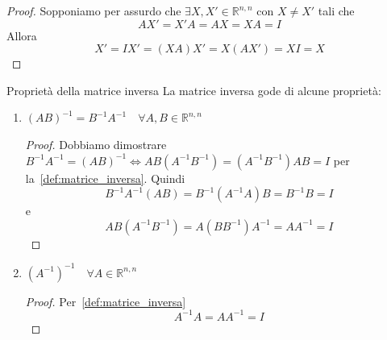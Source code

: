 \begin{proof}
  Sopponiamo per assurdo che $\exists X,X'\in\mathbb{R}^{n,n}$ con $X\neq X'$ tali che
  \begin{equation*}
    AX'=X'A=AX=XA=I
  \end{equation*}
  Allora
  \begin{equation*}
    X'=IX' = (XA)X' = X(AX') = XI = X
  \end{equation*}
\end{proof}

\begin{SubDef}{Proprietà della matrice inversa}
  La matrice inversa gode di alcune proprietà:
  \begin{enumerate}
    \item $(AB)^{-1} = B^{-1}A^{-1}\quad\forall A,B\in\mathbb{R}^{n,n}$
      \begin{proof}
        Dobbiamo dimostrare $B^{-1}A^{-1}={(AB)}^{-1}\iff
          AB(A^{-1}B^{-1})=(A^{-1}B^{-1})AB=I$ per la~\autoref{def:matrice_inversa}.
          Quindi
          \begin{equation*}
            B^{-1}A^{-1}(AB) = B^{-1}(A^{-1}A)B = B^{-1}B = I
          \end{equation*}
          e
          \begin{equation*}
            AB(A^{-1}B^{-1}) = A(BB^{-1})A^{-1} = AA^{-1} = I
          \end{equation*}
      \end{proof}
    \item ${(A^{-1})}^{-1}\quad\forall A\in\mathbb{R}^{n,n}$
      \begin{proof}
        Per~\autoref{def:matrice_inversa}
        \begin{equation*}
          A^{-1}A = AA^{-1} = I
        \end{equation*}
      \end{proof}
  \end{enumerate}
\end{SubDef}


